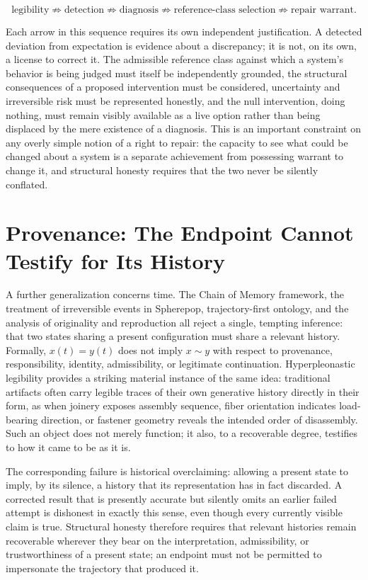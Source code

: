 \documentclass[11pt]{article}
\begin{document}
\[
\text{legibility} \not\Rightarrow \text{detection} \not\Rightarrow \text{diagnosis} \not\Rightarrow \text{reference-class selection} \not\Rightarrow \text{repair warrant}.
\]

Each arrow in this sequence requires its own independent justification. A detected deviation from expectation is evidence about a discrepancy; it is not, on its own, a license to correct it. The admissible reference class against which a system's behavior is being judged must itself be independently grounded, the structural consequences of a proposed intervention must be considered, uncertainty and irreversible risk must be represented honestly, and the null intervention, doing nothing, must remain visibly available as a live option rather than being displaced by the mere existence of a diagnosis. This is an important constraint on any overly simple notion of a right to repair: the capacity to see what could be changed about a system is a separate achievement from possessing warrant to change it, and structural honesty requires that the two never be silently conflated.

\section{Provenance: The Endpoint Cannot Testify for Its History}
\label{sec:provenance}

A further generalization concerns time. The Chain of Memory framework, the treatment of irreversible events in Spherepop, trajectory-first ontology, and the analysis of originality and reproduction all reject a single, tempting inference: that two states sharing a present configuration must share a relevant history. Formally, $x(t) = y(t)$ does not imply $x \sim y$ with respect to provenance, responsibility, identity, admissibility, or legitimate continuation. Hyperpleonastic legibility provides a striking material instance of the same idea: traditional artifacts often carry legible traces of their own generative history directly in their form, as when joinery exposes assembly sequence, fiber orientation indicates load-bearing direction, or fastener geometry reveals the intended order of disassembly. Such an object does not merely function; it also, to a recoverable degree, testifies to how it came to be as it is.

The corresponding failure is historical overclaiming: allowing a present state to imply, by its silence, a history that its representation has in fact discarded. A corrected result that is presently accurate but silently omits an earlier failed attempt is dishonest in exactly this sense, even though every currently visible claim is true. Structural honesty therefore requires that relevant histories remain recoverable wherever they bear on the interpretation, admissibility, or trustworthiness of a present state; an endpoint must not be permitted to impersonate the trajectory that produced it.
\end{document}
